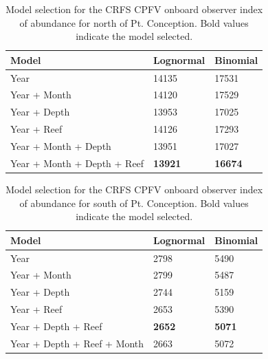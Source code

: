 \documentclass[12pt,]{article}
\begin{document}
\begin{table}[ht]
\centering
\caption{Model selection for the CRFS CPFV onboard observer 
                                        index of abundance for north of Pt. Conception. Bold 
                                        values indicate the model selected.} 
\label{tab:Fleet6_AIC}
\begin{tabular}{lll}
  \hline
Model & Lognormal & Binomial \\ 
  \hline
Year & 14135 & 17531 \\ 
  Year + Month & 14120 & 17529 \\ 
  Year + Depth & 13953 & 17025 \\ 
  Year + Reef & 14126 & 17293 \\ 
  Year + Month + Depth & 13951 & 17027 \\ 
  Year + Month + Depth + Reef & \textbf{13921} & \textbf{16674} \\ 
   \hline
\end{tabular}
\end{table}

\vspace{3cm}

\begin{table}[ht]
\centering
\caption{Model selection for the CRFS CPFV onboard observer 
                                        index of abundance for south of Pt. Conception. Bold 
                                        values indicate the model selected.} 
\label{tab:Fleet7_AIC}
\begin{tabular}{lll}
  \hline
Model & Lognormal & Binomial \\ 
  \hline
Year & 2798 & 5490 \\ 
  Year + Month & 2799 & 5487 \\ 
  Year + Depth & 2744 & 5159 \\ 
  Year + Reef & 2653 & 5390 \\ 
  Year + Depth + Reef & \textbf{2652} & \textbf{5071} \\ 
  Year + Depth + Reef + Month & 2663 & 5072 \\ 
   \hline
\end{tabular}
\end{table}

\newpage

\FloatBarrier

\vspace{3cm}
\end{document}
